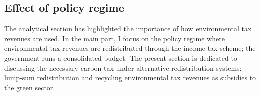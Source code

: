 
\clearpage
\subsection{Effect of policy regime}\label{app:pol_regimes}

The analytical section has highlighted the importance of how environmental tax revenues are used. In the main part, I focus on the policy regime where environmental tax revenues are redistributed through the income tax scheme; the government runs a consolidated budget. 
The present section is dedicated to discussing the necessary carbon tax under alternative redistribution systems: lump-sum redistribution and recycling environmental tax revenues as subsidies to the green sector. 

